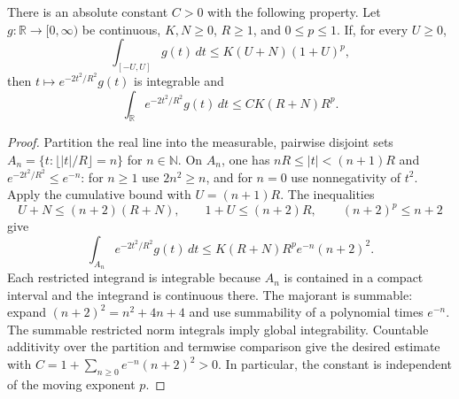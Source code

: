 \begin{lemma}
\label{density:gaussian-cumulative}
\leanok
There is an absolute constant $C>0$ with the following property.
Let $g:\mathbb R\to[0,\infty)$ be continuous, $K,N\geq0$,
$R\geq1$, and $0\leq p\leq1$.  If, for every $U\geq0$,
\[
 \int_{[-U,U]}g(t)\,dt\leq K(U+N)(1+U)^p,
\]
then $t\mapsto e^{-2t^2/R^2}g(t)$ is integrable and
\[
 \int_{\mathbb R}e^{-2t^2/R^2}g(t)\,dt
 \leq CK(R+N)R^p.
\]
\end{lemma}
\begin{proof}
Partition the real line into the measurable, pairwise disjoint sets
$A_n=\{t:\lfloor|t|/R\rfloor=n\}$ for $n\in\mathbb N$.
On $A_n$, one has $nR\leq|t|<(n+1)R$ and
$e^{-2t^2/R^2}\leq e^{-n}$: for $n\geq1$ use $2n^2\geq n$,
and for $n=0$ use nonnegativity of $t^2$.
Apply the cumulative bound with $U=(n+1)R$.  The inequalities
\[
 U+N\leq(n+2)(R+N),\qquad 1+U\leq(n+2)R,
 \qquad(n+2)^p\leq n+2
\]
give
\[
 \int_{A_n}e^{-2t^2/R^2}g(t)\,dt
 \leq K(R+N)R^p e^{-n}(n+2)^2.
\]
Each restricted integrand is integrable because $A_n$ is contained
in a compact interval and the integrand is continuous there.
The majorant is summable: expand $(n+2)^2=n^2+4n+4$ and use
summability of a polynomial times $e^{-n}$.
The summable restricted norm integrals imply global integrability.
Countable additivity over the partition and termwise comparison give
the desired estimate with
$C=1+\sum_{n\geq0}e^{-n}(n+2)^2>0$.
In particular, the constant is independent of the moving exponent $p$.
\end{proof}

